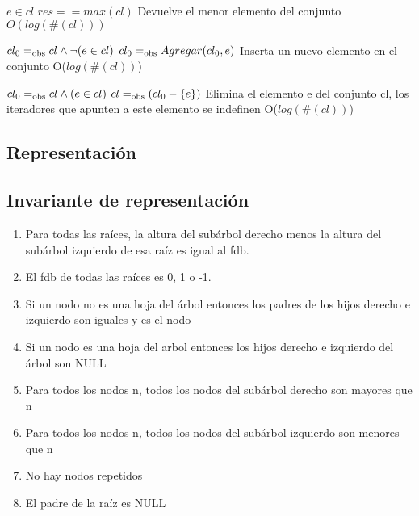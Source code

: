 {$e \in cl$}
{$res == max(cl)$}
{Devuelve el menor elemento del conjunto}
{$O(log(\#(cl)))$}
{}

{$cl_0 =_{\mathrm{obs}} cl \land \neg(e \in cl)$}
{$cl_0 =_{\mathrm{obs}} Agregar(cl_0, e)$}
{Inserta un nuevo elemento en el conjunto}
{O($log(\#(cl))$)}
{}

{$cl_0 =_{\mathrm{obs}} cl \land (e \in cl)$}
{$cl =_{\mathrm{obs}} (cl_0 - \{e\})$}
{Elimina el elemento e del conjunto cl, los iteradores que apunten a este elemento se indefinen}
{O($log(\#(cl))$)}
{}

\subsection{Representación}


\newpage
\subsection{Invariante de representación}

\begin{enumerate}
	\item Para todas las raíces, la altura del subárbol derecho menos la altura del subárbol izquierdo de esa raíz es igual al fdb.
	\item El fdb de todas las raíces es 0, 1 o -1.
	\item Si un nodo no es una hoja del árbol entonces los padres de los hijos derecho e izquierdo son iguales y es el nodo
	\item Si un nodo es una hoja del arbol entonces los hijos derecho e izquierdo del árbol son NULL
	\item Para todos los nodos n, todos los nodos del subárbol derecho son mayores que n
	\item Para todos los nodos n, todos los nodos del subárbol izquierdo son menores que n
	\item No hay nodos repetidos
	\item El padre de la raíz es NULL
\end{enumerate}

